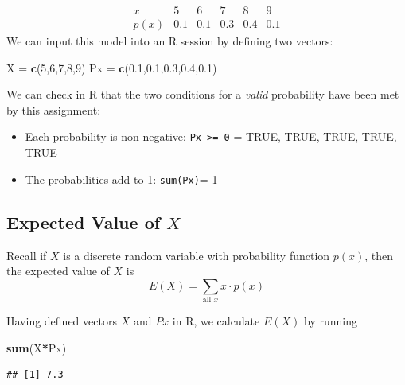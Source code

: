 \documentclass[
]{book}
\newenvironment{Shaded}{\begin{snugshade}}{\end{snugshade}}
\newcommand{\DecValTok}[1]{\textcolor[rgb]{0.00,0.00,0.81}{#1}}
\newcommand{\FloatTok}[1]{\textcolor[rgb]{0.00,0.00,0.81}{#1}}
\newcommand{\FunctionTok}[1]{\textcolor[rgb]{0.13,0.29,0.53}{\textbf{#1}}}
\newcommand{\NormalTok}[1]{#1}
\newcommand{\OtherTok}[1]{\textcolor[rgb]{0.56,0.35,0.01}{#1}}
\newcommand{\SpecialCharTok}[1]{\textcolor[rgb]{0.81,0.36,0.00}{\textbf{#1}}}
\providecommand{\tightlist}{%
  \setlength{\itemsep}{0pt}\setlength{\parskip}{0pt}}
\theoremstyle{definition}
\theoremstyle{definition}
\theoremstyle{definition}
\theoremstyle{definition}
\theoremstyle{remark}
\begin{document}
\[
\begin{array}{c|c|c|c|c|c}
x & 5 & 6 & 7 & 8 & 9 \\ \hline
p(x) & 0.1 & 0.1 & 0.3 & 0.4 & 0.1 
\end{array}
\]
We can input this model into an R session by defining two vectors:

\begin{Shaded}
\begin{Highlighting}[]
\NormalTok{X }\OtherTok{=} \FunctionTok{c}\NormalTok{(}\DecValTok{5}\NormalTok{,}\DecValTok{6}\NormalTok{,}\DecValTok{7}\NormalTok{,}\DecValTok{8}\NormalTok{,}\DecValTok{9}\NormalTok{)}
\NormalTok{Px }\OtherTok{=} \FunctionTok{c}\NormalTok{(}\FloatTok{0.1}\NormalTok{,}\FloatTok{0.1}\NormalTok{,}\FloatTok{0.3}\NormalTok{,}\FloatTok{0.4}\NormalTok{,}\FloatTok{0.1}\NormalTok{)}
\end{Highlighting}
\end{Shaded}

We can check in R that the two conditions for a \emph{valid} probability have been met by this assignment:

\begin{itemize}
\tightlist
\item
  Each probability is non-negative: \texttt{Px\ \textgreater{}=\ 0} = TRUE, TRUE, TRUE, TRUE, TRUE
\item
  The probabilities add to 1: \texttt{sum(Px)}= 1
\end{itemize}

\subsection*{\texorpdfstring{Expected Value of \(X\)}{Expected Value of X}}\label{expected-value-of-x}

Recall if \(X\) is a discrete random variable with probability function \(p(x)\), then the expected value of \(X\) is \[E(X)=\sum_{\text{all }x}x\cdot p(x)\]

Having defined vectors \(X\) and \(Px\) in R, we calculate \(E(X)\) by running

\begin{Shaded}
\begin{Highlighting}[]
\FunctionTok{sum}\NormalTok{(X}\SpecialCharTok{*}\NormalTok{Px) }
\end{Highlighting}
\end{Shaded}

\begin{verbatim}
## [1] 7.3
\end{verbatim}
\end{document}

